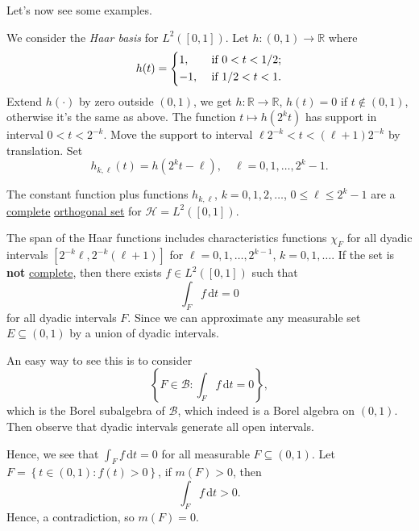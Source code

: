 Let's now see some examples.

\begin{eg}
	We consider the \emph{Haar basis} for \(L^2([0, 1])\). Let \(h\colon (0, 1)\to \mathbb{R} \) where
	\[
		h(t) = \begin{dcases}
			1,  & \text{ if } 0 < t < 1 / 2; \\
			-1, & \text{ if } 1 / 2 < t < 1.
		\end{dcases}
	\]
	Extend \(h(\cdot)\) by zero outside \((0, 1)\), we get \(h\colon \mathbb{R} \to \mathbb{R} \), \(h(t) = 0\) if \(t \notin (0, 1)\), otherwise it's the same as above. The function \(t\mapsto h(2^k t)\) has support in interval \(0 < t < 2^{-k}\). Move the support to interval \(\ell 2^{-k} < t < (\ell +1)2^{-k}\) by translation. Set
	\[
		h_{k, \ell }(t) = h(2^{k}t - \ell ),\quad \ell = 0, 1, \dots , 2^k - 1.
	\]

	The constant function plus functions \(h_{k, \ell }\), \(k = 0, 1, 2, \dots  \), \(0 \leq \ell \leq 2^k - 1\) are a \hyperref[def:complete-system]{complete} \hyperref[def:orthogonal-system]{orthogonal set} for \(\mathcal{H} = L^2([0, 1])\).
\end{eg}
\begin{explanation}
	The span of the Haar functions includes characteristics functions \(\chi _F\) for all dyadic intervals \([2^{-k}\ell , 2^{-k}(\ell +1)]\) for \(\ell = 0, 1, \dots  , 2^{k-1} \), \(k = 0, 1, \dots\). If the set is \textbf{not} \hyperref[def:complete-system]{complete}, then there exists \(f\in L^2([0, 1])\) such that
	\[
		\int _F f\,\mathrm{d} t = 0
	\]
	for all dyadic intervals \(F\). Since we can approximate any measurable set \(E\subseteq (0, 1)\) by a union of dyadic intervals.
	\begin{intuition}
		An easy way to see this is to consider
		\[
			\left\{ F\in \mathcal{B} \colon \int _F f\,\mathrm{d} t = 0 \right\},
		\]
		which is the Borel subalgebra of \(\mathcal{B} \), which indeed is a Borel algebra on \((0, 1)\). Then observe that dyadic intervals generate all open intervals.
	\end{intuition}

	Hence, we see that \(\int _F f\,\mathrm{d} t= 0\) for all measurable \(F\subseteq (0, 1)\). Let \(F = \left\{ t\in (0, 1)\colon f(t) > 0 \right\} \), if \(m(F) > 0\), then
	\[
		\int _F f\,\mathrm{d} t > 0.
	\]
	Hence, a contradiction, so \(m(F) = 0\).
\end{explanation}

